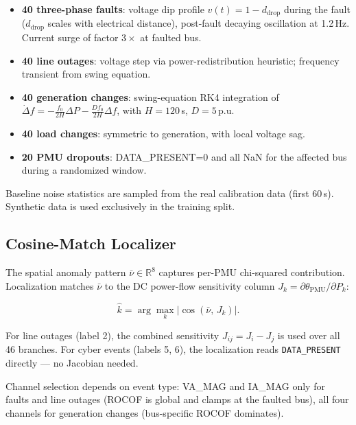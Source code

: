 \documentclass[conference]{IEEEtran}
\begin{document}
\begin{itemize}
  \item \textbf{40 three-phase faults}: voltage dip profile
    $v(t) = 1 - d_\text{drop}$ during the fault ($d_\text{drop}$ scales
    with electrical distance), post-fault decaying oscillation at 1.2\,Hz.
    Current surge of factor $3\times$ at faulted bus.
  \item \textbf{40 line outages}: voltage step via power-redistribution heuristic;
    frequency transient from swing equation.
  \item \textbf{40 generation changes}: swing-equation RK4 integration of
    $\dot\Delta f = -\frac{f_0}{2H}\Delta P - \frac{Df_0}{2H}\Delta f$,
    with $H=120$\,s, $D=5$\,p.u.
  \item \textbf{40 load changes}: symmetric to generation, with local voltage sag.
  \item \textbf{20 PMU dropouts}: DATA\_PRESENT=0 and all NaN for the affected
    bus during a randomized window.
\end{itemize}

Baseline noise statistics are sampled from the real calibration data (first 60\,s).
Synthetic data is used exclusively in the training split.

\subsection{Cosine-Match Localizer}

The spatial anomaly pattern $\bar\nu \in \mathbb{R}^8$ captures per-PMU
chi-squared contribution.  Localization matches $\bar\nu$ to the
DC power-flow sensitivity column $J_k = \partial\theta_\text{PMU} / \partial P_k$:

\begin{equation}
  \hat k = \arg\max_{k} \bigl|\cos(\bar\nu,\, J_k)\bigr|.
\end{equation}

For line outages (label 2), the combined sensitivity $J_{ij} = J_i - J_j$
is used over all 46 branches.  For cyber events (labels 5, 6), the localization
reads \texttt{DATA\_PRESENT} directly — no Jacobian needed.

Channel selection depends on event type: VA\_MAG and IA\_MAG only for faults
and line outages (ROCOF is global and clamps at the faulted bus), all four
channels for generation changes (bus-specific ROCOF dominates).

\end{document}
